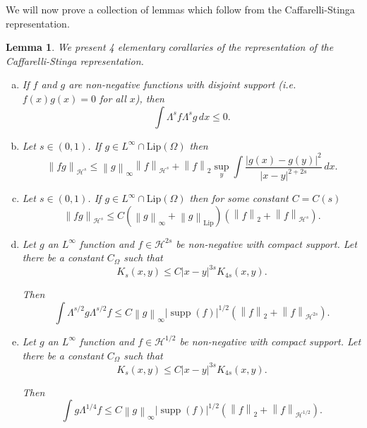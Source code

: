 \documentclass[11pt]{amsart}
\newtheorem{lemma}[theorem]{Lemma}
\theoremstyle{remark}
\theoremstyle{definition}
\newcommand{\norm}[1]{\left\lVert#1\right\rVert}
\newcommand{\paren}[1]{\left( #1 \right)}
\DeclareMathOperator{\supp}{supp}
\newcommand{\Lip}{\text{Lip}}
\newcommand{\HD}{\mathcal{H}}
\newcommand{\Comega}{C_\Omega}
\begin{document}
We will now prove a collection of lemmas which follow from the Caffarelli-Stinga representation.  

\begin{lemma} \label{thm:Lambda stuff}
We present 4 elementary corallaries of the representation of the Caffarelli-Stinga representation.  

\begin{enumerate}[(a)]
\item \label{thm:disjoint} If $f$ and $g$ are non-negative functions with disjoint support (i.e. $f(x)g(x) = 0$ for all $x$), then 
\[ \int \Lambda^s f \Lambda^s g \,dx \leq 0. \]

\item \label{thm:product rule} Let $s \in (0,1)$.  If $g \in L^\infty \cap \Lip(\Omega)$ then
\[ \norm{fg}_{\HD^s} \leq \norm{g}_\infty \norm{f}_{\HD^s} + \norm{f}_2 \sup_y \int \frac{|g(x)-g(y)|^2}{|x-y|^{2+2s}} \,dx. \]

\item \label{thm:extra product rule} Let $s \in (0,1)$.  If $g \in L^\infty \cap \Lip(\Omega)$ then for some constant $C=C(s)$
\[  \norm{fg}_{\HD^s} \leq C \paren{\norm{g}_\infty + \norm{g}_\Lip} \paren{\norm{f}_2 + \norm{f}_{\HD^s}}. \]

\item \label{thm:L1 of Lambda bounded} Let $g$ an $L^\infty$ function and $f \in \HD^{2s}$ be non-negative with compact support.  Let there be a constant $\Comega$ such that
\begin{equation} \label{K bounded between orders} K_s(x,y) \leq C |x-y|^{3s} K_{4s}(x,y). \end{equation}

Then
\[ \int \Lambda^{s/2} g \Lambda^{s/2} f \leq C \norm{g}_\infty |\supp(f)|^{1/2} \paren{ \norm{f}_2 + \norm{f}_{\HD^{2s}}}. \]

\item \label{thm:L1 of Lambda1/4 bounded} Let $g$ an $L^\infty$ function and $f \in \HD^{1/2}$ be non-negative with compact support.  Let there be a constant $\Comega$ such that
\begin{equation} \label{K bounded between orders} K_s(x,y) \leq C |x-y|^{3s} K_{4s}(x,y). \end{equation}

Then
\[ \int g \Lambda^{1/4} f \leq C \norm{g}_\infty |\supp(f)|^{1/2} \paren{ \norm{f}_2 + \norm{f}_{\HD^{1/2}}}. \]

\end{enumerate}
\end{lemma}
\end{document}
